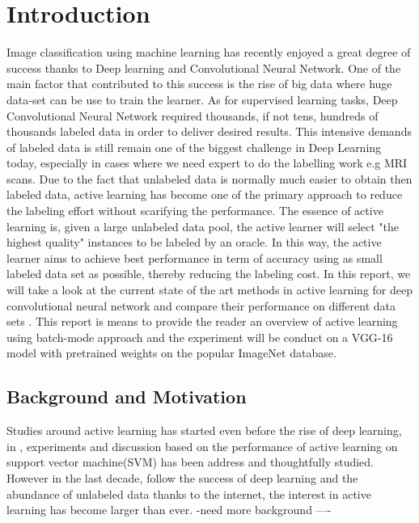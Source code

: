 \chapter{Introduction}
\label{cha:Introduction}
Image classification using machine learning has recently enjoyed a great degree of success thanks to Deep learning and Convolutional Neural Network. One of the main factor that contributed to this success is the rise of big data where huge data-set can be use to train the learner. As for supervised learning tasks, Deep Convolutional Neural Network required thousands, if not tens, hundreds of thousands labeled data in order to deliver desired results. This intensive demands of labeled data is still remain one of the biggest challenge in Deep Learning today, especially in cases where we need expert to do the labelling work e.g MRI scans. Due to the fact that unlabeled data is normally much easier to obtain then labeled data, active learning has become one of the primary approach to reduce the labeling effort without scarifying the performance. The essence of active learning is, given a large unlabeled data pool, the active learner will select "the highest quality" instances to be labeled by an oracle. In this way, the active learner aims to achieve best performance in term of accuracy using as small labeled data set as possible, thereby reducing the labeling cost. 
In this report, we will take a look at the current state of the art methods in active learning for deep convolutional neural network and compare their performance on different data sets . This report is means to provide the reader an overview of active learning using batch-mode approach and the experiment will be conduct on a VGG-16 model with pretrained weights on the popular ImageNet database.


\section{Background and Motivation}\label{cit}

\label{sec:BackgroundAndMotivation}
Studies around active learning has started even before the rise of deep learning, in \citet{tong2001active}, experiments and discussion based on the performance of active learning on support vector machine(SVM) has been address and thoughtfully studied. However in the last decade, follow the success of deep learning and the abundance of unlabeled data thanks to the internet, the interest in active learning has become larger than ever. 
-need more background ----

